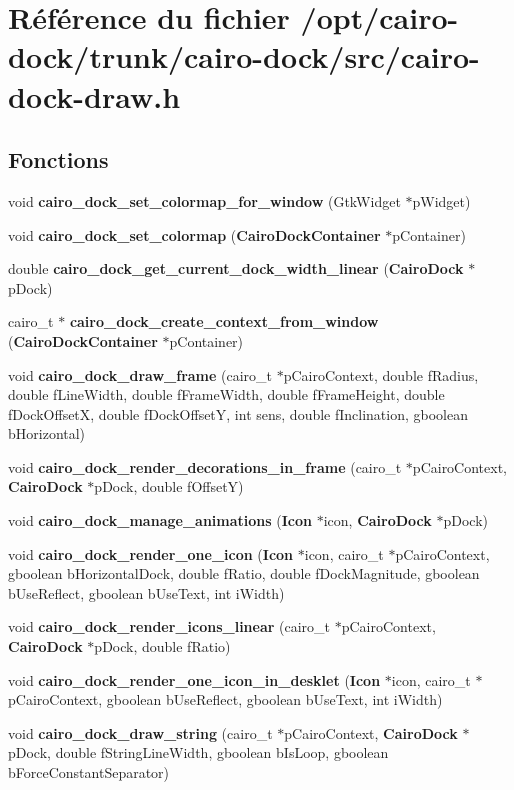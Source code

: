 \section{Référence du fichier /opt/cairo-dock/trunk/cairo-dock/src/cairo-dock-draw.h}
\label{cairo-dock-draw_8h}
\subsection*{Fonctions}
\begin{CompactItemize}
\item 
void {\bf cairo\_\-dock\_\-set\_\-colormap\_\-for\_\-window} (GtkWidget $\ast$pWidget)
\item 
void {\bf cairo\_\-dock\_\-set\_\-colormap} ({\bf CairoDockContainer} $\ast$pContainer)
\item 
double {\bf cairo\_\-dock\_\-get\_\-current\_\-dock\_\-width\_\-linear} ({\bf CairoDock} $\ast$pDock)
\item 
cairo\_\-t $\ast$ {\bf cairo\_\-dock\_\-create\_\-context\_\-from\_\-window} ({\bf CairoDockContainer} $\ast$pContainer)
\item 
void {\bf cairo\_\-dock\_\-draw\_\-frame} (cairo\_\-t $\ast$pCairoContext, double fRadius, double fLineWidth, double fFrameWidth, double fFrameHeight, double fDockOffsetX, double fDockOffsetY, int sens, double fInclination, gboolean bHorizontal)
\item 
void {\bf cairo\_\-dock\_\-render\_\-decorations\_\-in\_\-frame} (cairo\_\-t $\ast$pCairoContext, {\bf CairoDock} $\ast$pDock, double fOffsetY)
\item 
void {\bf cairo\_\-dock\_\-manage\_\-animations} ({\bf Icon} $\ast$icon, {\bf CairoDock} $\ast$pDock)
\item 
void {\bf cairo\_\-dock\_\-render\_\-one\_\-icon} ({\bf Icon} $\ast$icon, cairo\_\-t $\ast$pCairoContext, gboolean bHorizontalDock, double fRatio, double fDockMagnitude, gboolean bUseReflect, gboolean bUseText, int iWidth)
\item 
void {\bf cairo\_\-dock\_\-render\_\-icons\_\-linear} (cairo\_\-t $\ast$pCairoContext, {\bf CairoDock} $\ast$pDock, double fRatio)
\item 
void {\bf cairo\_\-dock\_\-render\_\-one\_\-icon\_\-in\_\-desklet} ({\bf Icon} $\ast$icon, cairo\_\-t $\ast$pCairoContext, gboolean bUseReflect, gboolean bUseText, int iWidth)
\item 
void {\bf cairo\_\-dock\_\-draw\_\-string} (cairo\_\-t $\ast$pCairoContext, {\bf CairoDock} $\ast$pDock, double fStringLineWidth, gboolean bIsLoop, gboolean bForceConstantSeparator)

\end{CompactItemize}
